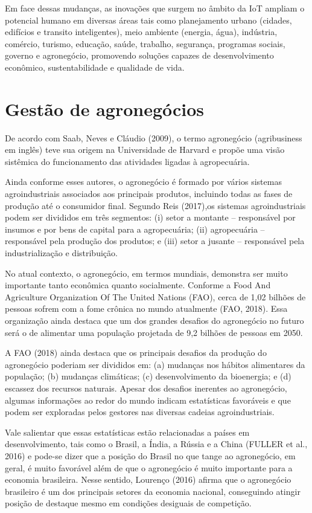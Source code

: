 \documentclass[eso]{bcc}
\begin{document}
Em face dessas mudanças, as inovações que surgem no âmbito da IoT ampliam o potencial humano 
em diversas áreas tais como planejamento urbano (cidades, edifícios e transito inteligentes), 
meio ambiente (energia, água), indústria, comércio, turismo, educação, saúde, trabalho, 
segurança, programas sociais, governo e agronegócio, promovendo soluções capazes de 
desenvolvimento econômico, sustentabilidade e qualidade de vida.

\section{Gestão de agronegócios}
De acordo com Saab, Neves e Cláudio (2009), o termo agronegócio (agribusiness em inglês) teve 
sua origem na Universidade de Harvard e propõe uma visão sistêmica do funcionamento das atividades 
ligadas à agropecuária.

Ainda conforme esses autores, o agronegócio é formado por vários sistemas agroindustriais  
associados  aos  principais  produtos,  incluindo  todas  as  fases  de  produção até o 
consumidor final. Segundo Reis (2017),os sistemas agroindustriais podem ser divididos em 
três segmentos: (i) setor a montante – responsável por insumos e por bens de capital para a agropecuária; 
(ii) agropecuária – responsável pela produção dos produtos; e 
(iii) setor a jusante – responsável pela industrialização e distribuição.

No atual contexto, o agronegócio, em termos mundiais, demonstra ser muito importante tanto 
econômica quanto socialmente. Conforme a Food And Agriculture Organization Of The United Nations (FAO), 
cerca de 1,02 bilhões de pessoas sofrem com a fome crônica no mundo atualmente (FAO, 2018). 
Essa organização ainda destaca que um dos grandes desafios do agronegócio no futuro será o de 
alimentar uma população projetada de 9,2 bilhões de pessoas em 2050.

A FAO (2018) ainda destaca que os principais desafios da produção do agronegócio poderiam ser 
divididos em: (a) mudanças nos hábitos alimentares da população; (b) mudanças climáticas; 
(c) desenvolvimento da bioenergia; e (d) escassez dos recursos naturais. Apesar dos desafios 
inerentes ao agronegócio, algumas informações ao redor do mundo indicam estatísticas favoráveis 
e que podem ser exploradas pelos gestores nas diversas cadeias agroindustriais.

Vale salientar que essas estatísticas estão relacionadas a países em desenvolvimento, 
tais como o Brasil, a Índia, a Rússia e a China (FULLER et al., 2016) e pode-se dizer que a 
posição do Brasil no que tange ao agronegócio, em geral, é muito favorável além de que o 
agronegócio é muito importante para a economia brasileira. Nesse sentido, Lourenço (2016) 
afirma que o agronegócio brasileiro é um dos principais setores da economia nacional, conseguindo 
atingir posição  de  destaque  mesmo  em  condições  desiguais  de  competição.
\end{document}
